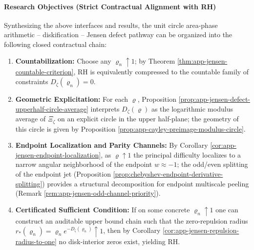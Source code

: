 \paragraph{Research Objectives (Strict Contractual Alignment with RH)}\label{par:app-jensen-research-target-chain}
Synthesizing the above interfaces and results, the unit circle area-phase arithmetic -- diskification -- Jensen defect pathway can be organized into the following closed contractual chain:
\begin{enumerate}
  \item \textbf{Countabilization:} Choose any \(\varrho_n\uparrow 1\); by Theorem \ref{thm:app-jensen-countable-criterion}, RH is equivalently compressed to the countable family of constraints \(D_{\zeta}(\varrho_n)=0\).
  \item \textbf{Geometric Explicitation:} For each \(\varrho\), Proposition \ref{prop:app-jensen-defect-upperhalf-circle-average} interprets \(D_{\zeta}(\varrho)\) as the logarithmic modulus average of \(\Xi_{\zeta}\) on an explicit circle in the upper half-plane; the geometry of this circle is given by Proposition \ref{prop:app-cayley-preimage-modulus-circle}.
  \item \textbf{Endpoint Localization and Parity Channels:} By Corollary \ref{cor:app-jensen-endpoint-localization}, as \(\varrho\uparrow 1\) the principal difficulty localizes to a narrow angular neighborhood of the endpoint \(w\approx-1\); the odd/even splitting of the endpoint jet (Proposition \ref{prop:chebyshev-endpoint-derivative-splitting}) provides a structural decomposition for endpoint multiscale peeling (Remark \ref{rem:app-jensen-odd-channel-priority}).
  \item \textbf{Certificated Sufficient Condition:} If on some concrete \(\varrho_n\uparrow 1\) one can construct an auditable upper bound chain such that the zero-repulsion radius \(r_{\ast}(\varrho_n)=\varrho_n e^{-D_{\zeta}(\varrho_n)}\uparrow 1\), then by Corollary \ref{cor:app-jensen-repulsion-radius-to-one} no disk-interior zeros exist, yielding RH.
\end{enumerate}
